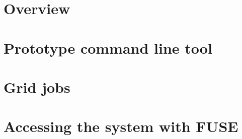 \documentclass{book}
\begin{document}
\section{Overview} %
\label{sec:overview}


\section{Prototype command line tool} %
\label{sec:prototype_command_line_tool}


\section{Grid jobs} %
\label{sec:grid_jobs}


\section{Accessing the system with FUSE} %
\label{sec:accessing_the_system_with_fuse}



% 
\end{document}
